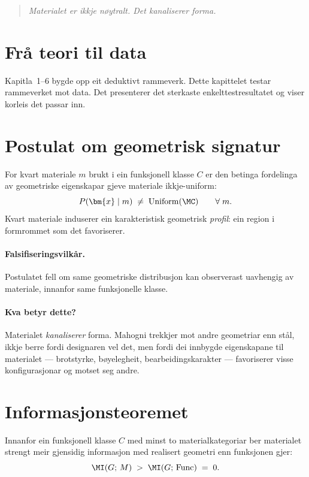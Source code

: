 \begin{quote}
\itshape
Materialet er ikkje nøytralt. Det kanaliserer forma.
\end{quote}

\section{Frå teori til data}

Kapitla~1--6 bygde opp eit deduktivt rammeverk. Dette kapittelet
testar rammeverket mot data. Det presenterer det sterkaste
enkelttestresultatet og viser korleis det passar inn.


\section{Postulat om geometrisk signatur}

\begin{postmark}\label{post:L.6.1}
For kvart materiale $m$ brukt i ein funksjonell klasse $C$ er den
betinga fordelinga av geometriske eigenskapar gjeve materiale
ikkje-uniform:
\[
  P(\bm{x} \mid m) \;\neq\; \mathrm{Uniform}(\MC)
  \qquad \forall\; m.
\]
Kvart materiale induserer ein karakteristisk geometrisk
\emph{profil}: ein region i formrommet som det favoriserer.
\end{postmark}

\paragraph{Falsifiseringsvilkår.}
Postulatet fell om same geometriske distribusjon kan observerast
uavhengig av materiale, innanfor same funksjonelle klasse.

\paragraph{Kva betyr dette?}
Materialet \emph{kanaliserer} forma. Mahogni trekkjer mot andre
geometriar enn stål, ikkje berre fordi designaren vel det, men
fordi dei innbygde eigenskapane til materialet --- brotstyrke,
bøyelegheit, bearbeidingskarakter --- favoriserer visse
konfigurasjonar og motset seg andre.


\section{Informasjonsteoremet}

\begin{satmark}[Informasjonsteoremet]\label{thm:L.6.2}
Innanfor ein funksjonell klasse $C$ med minst to materialkategoriar
ber materialet strengt meir gjensidig informasjon med realisert
geometri enn funksjonen gjer:
\[
  \MI(G;\, M) \;>\; \MI(G;\, \mathrm{Func}) \;=\; 0.
\]
\end{satmark}

